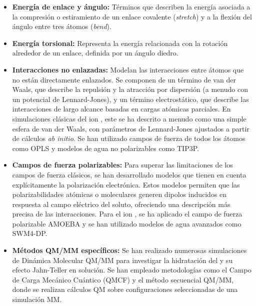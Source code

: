 \begin{itemize}
    \item \textbf{Energía de enlace y ángulo:} Términos que describen la energía asociada a la compresión o estiramiento de un enlace covalente (\textit{stretch}) y a la flexión del ángulo entre tres átomos (\textit{bend}).
    
    \item \textbf{Energía torsional:} Representa la energía relacionada con la rotación alrededor de un enlace, definida por un ángulo diedro.
    
    \item \textbf{Interacciones no enlazadas:} Modelan las interacciones entre átomos que no están directamente enlazados. Se componen de un término de van der Waals, que describe la repulsión y la atracción por dispersión (a menudo con un potencial de Lennard-Jones), y un término electrostático, que describe las interacciones de largo alcance basadas en cargas atómicas parciales. En simulaciones clásicas del ion , este se ha descrito a menudo como una simple esfera de van der Waals, con parámetros de Lennard-Jones ajustados a partir de cálculos \textit{ab initio}. Se han utilizado campos de fuerza de todos los átomos como OPLS y modelos de agua no polarizables como TIP3P.
    
    \item \textbf{Campos de fuerza polarizables:} Para superar las limitaciones de los campos de fuerza clásicos, se han desarrollado modelos que tienen en cuenta explícitamente la polarización electrónica. Estos modelos permiten que las polarizabilidades atómicas o moleculares generen dipolos inducidos en respuesta al campo eléctrico del soluto, ofreciendo una descripción más precisa de las interacciones. Para el ion , se ha aplicado el campo de fuerza polarizable AMOEBA y se han utilizado modelos de agua avanzados como SWM4-DP.
    
    \item \textbf{Métodos QM/MM específicos:} Se han realizado numerosas simulaciones de Dinámica Molecular QM/MM para investigar la hidratación del  y su efecto Jahn-Teller en solución. Se han empleado metodologías como el Campo de Carga Mecánico Cuántico (QMCF) y el método secuencial QM/MM, donde se realizan cálculos QM sobre configuraciones seleccionadas de una simulación MM.
\end{itemize}

